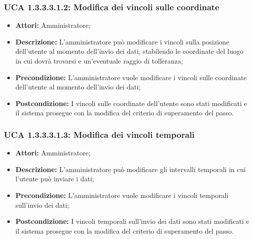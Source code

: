 \hypertarget{A1.3.3.3.1.2}{}
\subsubsection{UCA 1.3.3.3.1.2: Modifica dei vincoli sulle coordinate}
\begin{itemize}
\item \textbf{Attori:}
Amministratore;
\item \textbf{Descrizione:}
L'amministratore può modificare i vincoli sulla posizione dell'utente al momento dell'invio dei dati, stabilendo le coordinate del luogo in cui dovrà trovarsi e un'eventuale raggio di tolleranza;
\item \textbf{Precondizione:}
L'amministratore vuole modificare i vincoli sulle coordinate dell'utente al momento dell'invio dei dati;
\item \textbf{Postcondizione:}
I vincoli sulle coordinate dell'utente sono stati modificati e il sistema prosegue con la modifica del criterio di superamento del passo.
\end{itemize}

\hypertarget{A1.3.3.3.1.3}{}
\subsubsection{UCA 1.3.3.3.1.3: Modifica dei vincoli temporali}
\begin{itemize}
\item \textbf{Attori:}
Amministratore;
\item \textbf{Descrizione:}
L'amministratore può modificare gli intervalli temporali in cui l'utente può inviare i dati;
\item \textbf{Precondizione:}
L'amministratore vuole modificare i vincoli temporali sull'invio dei dati;
\item \textbf{Postcondizione:}
I vincoli temporali sull'invio dei dati sono stati modificati e il sistema prosegue con la modifica del criterio di superamento del passo.
\end{itemize}

\hypertarget{A1.3.3.3.1.4}{}
